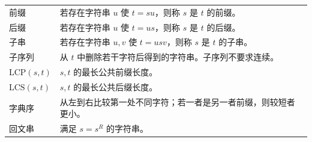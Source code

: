 \begin{center}
\renewcommand{\arraystretch}{1.25}
\begin{tabular}{p{}p{}}
前缀 & 若存在字符串 $u$ 使 $t=su$，则称 $s$ 是 $t$ 的前缀。\\
后缀 & 若存在字符串 $u$ 使 $t=us$，则称 $s$ 是 $t$ 的后缀。\\
子串 & 若存在字符串 $u,v$ 使 $t=usv$，则称 $s$ 是 $t$ 的子串。\\
子序列 & 从 $t$ 中删除若干字符后得到的字符串。子序列不要求连续。\\
$\mathrm{LCP}(s,t)$ & $s,t$ 的最长公共前缀长度。\\
$\mathrm{LCS}(s,t)$ & $s,t$ 的最长公共后缀长度。\\
字典序 & 从左到右比较第一处不同字符；若一者是另一者前缀，则较短者更小。\\
回文串 & 满足 $s=s^R$ 的字符串。\\
\end{tabular}
\end{center}



